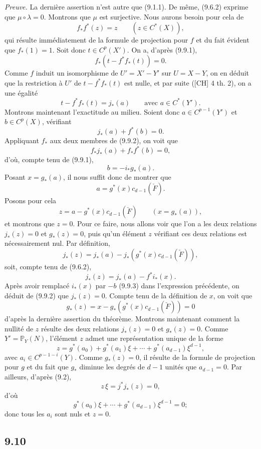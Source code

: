 \documentclass[11pt]{article}
\begin{document}
\emph{Preuve.} La dernière assertion n'est autre que (9.1.1). De même, (9.6.2) exprime que $\mu\circ\lambda=0$. Montrons que $\mu$ est surjective. Nous aurons besoin pour cela de
\[
f_*f^*(z)=z\qquad(z\in C^*(X)),
\tag{9.9.1}
\]
qui résulte immédiatement de la formule de projection pour $f$ et du fait évident que $f_*(1)=1$. Soit donc $t\in C^p(X')$. On a, d'après (9.9.1),
\[
f_*(t-f^*f_*(t))=0.
\]
Comme $f$ induit un isomorphisme de $U'=X'-Y'$ sur $U=X-Y$, on en déduit que la restriction à $U'$ de $t-f^*f_*(t)$ est nulle, et par suite ([CH] 4 th. 2), on a une égalité
\[
t-f^*f_*(t)=j_*(a)
\qquad\text{avec }a\in C^*(Y').
\]
Montrons maintenant l'exactitude au milieu. Soient donc $a\in C^{p-1}(Y')$ et $b\in C^p(X)$, vérifiant
\[
j_*(a)+f^*(b)=0.
\tag{9.9.2}
\]
Appliquant $f_*$ aux deux membres de (9.9.2), on voit que
\[
f_*j_*(a)+f_*f^*(b)=0,
\]
d'où, compte tenu de (9.9.1),
\[
b=-i_*g_*(a).
\tag{9.9.3}
\]
Posant $x=g_*(a)$, il nous suffit donc de montrer que
\[
a=g^*(x)c_{d-1}(\check F).
\tag{9.9.4}
\]
Posons pour cela
\[
z=a-g^*(x)c_{d-1}(\check F)\qquad(x=g_*(a)),
\]
et montrons que $z=0$. Pour ce faire, nous allons voir que l'on a les deux relations $j_*(z)=0$ et $g_*(z)=0$, puis qu'un élément $z$ vérifiant ces deux relations est nécessairement nul. Par définition,
\[
j_*(z)=j_*(a)-j_*(g^*(x)c_{d-1}(\check F)),
\]
soit, compte tenu de (9.6.2),
\[
j_*(z)=j_*(a)-f^*i_*(x).
\]
Après avoir remplacé $i_*(x)$ par $-b$ (9.9.3) dans l'expression précédente, on déduit de (9.9.2) que $j_*(z)=0$. Compte tenu de la définition de $x$, on voit que
\[
g_*(z)=x-g_*(g^*(x)c_{d-1}(\check F))=0
\]
d'après la dernière assertion du théorème. Montrons maintenant comment la nullité de $z$ résulte des deux relations $j_*(z)=0$ et $g_*(z)=0$. Comme $Y'=\mathbb P_Y(N)$, l'élément $z$ admet une représentation unique de la forme
\[
z=g^*(a_0)+g^*(a_1)\xi+\cdots+g^*(a_{d-1})\xi^{d-1},
\]
avec $a_i\in C^{p-1-i}(Y)$. Comme $g_*(z)=0$, il résulte de la formule de projection pour $g$ et du fait que $g_*$ diminue les degrés de $d-1$ unités que $a_{d-1}=0$. Par ailleurs, d'après (9.2),
\[
z\,\xi=j^*j_*(z)=0,
\]
d'où
\[
g^*(a_0)\xi+\cdots+g^*(a_{d-1})\xi^{d-1}=0;
\]
donc tous les $a_i$ sont nuls et $z=0$.

\subsection*{9.10}
\end{document}
